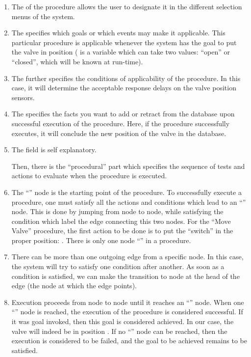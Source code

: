 \begin{enumerate}

\item The  of the procedure allows the user to designate it in the
different selection menus of the system.

\item The  specifies which goals or which events may make it
applicable. This particular procedure is applicable whenever the system has the
goal to put the valve in position  ( is a variable which can take two
values: ``open'' or ``closed'', which will be known at run-time).

\item The  further specifies the conditions of applicability of
the procedure. In this case, it will determine the acceptable response delays
on the valve position sensors.

\item The  specifies the facts you want to add or retract
from the database upon successful execution of the procedure. Here, if the
procedure successfully executes, it will conclude the new position of the valve
in the database.

\item The  field is self explanatory.

  Then, there is the ``procedural'' part which specifies the sequence of tests
  and actions to evaluate when the procedure is executed.

\item The ``'' node is the starting point of the procedure. To
successfully execute a procedure, one must satisfy all the actions and
conditions which lead to an ``'' node. This is done by jumping from node to
node, while satisfying the condition which label the edge connecting this two
nodes. For the ``Move Valve'' procedure, the first action to be done is to put
the ``switch'' in the proper position: . There is only one node
``'' in a procedure.

\item There can be more than one outgoing edge from a specific node. In
this case, the system will try to satisfy one condition after another. As soon as a condition 
is satisfied, we can make the transition to node at the head of the
edge (the node at which the edge points).

\item Execution proceeds from node to node until it reaches an ``'' node.
When one ``'' node is reached, the execution of the procedure is
considered successful. If it was goal invoked, then this goal is
considered  achieved. In our case, the valve will  indeed be in
position . If no ``'' node can be reached, then the execution is
considered to be failed, and the goal to be achieved remains to
be satisfied.

\end{enumerate}


